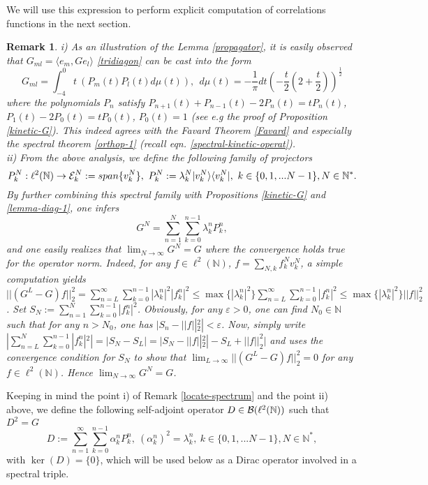 \documentclass[a4paper,11pt,twoside]{article}
\numberwithin{equation}{section}
\newtheorem{remark}[Theorem]{Remark}
\theoremstyle{nonumberplain}
\newcounter{and}
\begin{document}
We will use this expression to perform explicit computation of correlations functions in the next section. 
\begin{remark}\label{remark-dirac}
i) As an illustration of the Lemma \ref{propagator}, it is easily observed that $G_{ml}=\langle e_m,Ge_l \rangle $ \eqref{tridiagon} can be cast into the form 
\begin{equation}
G_{ml}=\int_{-4}^0t\ (P_m(t)P_l(t)d\mu(t)),\ \ d\mu(t)=-\frac{1}{\pi}dt(-\frac{t}{2}(2+\frac{t}{2}))^{\frac{1}{2}}\label{spectral-kineticterm}
\end{equation}
where the polynomials $P_n$ satisfy $P_{n+1}(t)+P_{n-1}(t)-2P_n(t)=tP_n(t)$, $P_1(t)-2P_0(t)=tP_0(t)$, $P_0(t)=1$ (see e.g the proof of Proposition \ref{kinetic-G}). This indeed agrees with the Favard Theorem \ref{Favard} and especially the spectral theorem \ref{orthop-1} (recall eqn. \eqref{spectral-kinetic-operat}).\\
ii) From the above analysis, we define the following family of projectors
\begin{equation}
P^N_k:\ell^2(\mathbb{N})\to {\cal{E}}^N_k:=span\{v^N_k\},\ P^N_k:=\lambda^N_k| v^N_k\rangle\langle v^N_k |,\ k\in\{0,1,...N-1 \}, N\in\mathbb{N}^*\label{proj-simple}.
\end{equation}
By further combining this spectral family with Propositions \ref{kinetic-G} and \ref{lemma-diag-1}, one infers
\begin{equation}
G^N=\sum_{n=1}^N\sum_{k=0}^{n-1}\lambda^n_kP^n_k\label{gn-projector},
\end{equation}
and one easily realizes that $\lim_{N\to\infty}G^N=G$ where the convergence holds true for the operator norm. Indeed, for any $f\in\ell^2(\mathbb{N})$, $f=\sum_{N,k}f^N_kv^N_k$, a simple computation yields $||(G^L-G)f ||^2_2=\sum_{n=L}^\infty\sum_{k=0}^{n-1}|\lambda^n_k|^2|f^n_k|^2\le\max\{|\lambda^n_k|^2 \}\sum_{n=L}^\infty\sum_{k=0}^{n-1}|f^n_k|^2\le \max\{|\lambda^n_k|^2 \}||f||_2^2$. Set $S_N:=\sum_{n=1}^N\sum_{k=0}^{n-1}|f^n_k|^2$. Obviously, for any $\varepsilon>0$, one can find $N_0\in\mathbb{N}$ such that for any $n>N_0$, one has $|S_n-||f||^2_2|<\varepsilon$. Now, simply write $|\sum_{n=L}^N\sum_{k=0}^{n-1}|f^n_k|^2|=|S_N-S_L|=|S_N-||f||^2_2|-S_L+||f||^2_2|$ and uses the convergence condition for $S_N$ to show that $\lim_{L\to\infty}||(G^L-G)f ||^2_2=0$ for any $f\in\ell^2(\mathbb{N})$. Hence $\lim_{N\to\infty}G^N=G$.
\end{remark}
Keeping in mind the point i) of Remark \ref{locate-spectrum} and the point ii) above, we define the following self-adjoint operator $D\in{\cal{B}}(\ell^2(\mathbb{N}))$ such that $D^2=G$
\begin{equation}
D:=\sum_{n=1}^\infty\sum_{k=0}^{n-1}\alpha^n_kP^n_k, \ (\alpha^n_k)^2=\lambda^n_k,\ k\in\{0,1,...N-1 \}, N\in\mathbb{N}^*\label{Dirac-simple},
\end{equation}
with $\ker(D)=\{0 \}$, which will be used below as a Dirac operator involved in a spectral triple.
\end{document}
